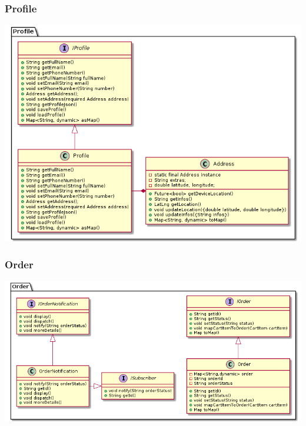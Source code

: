 \documentclass{article}
\begin{document}
\subsubsection{Profile}
\includegraphics[scale=0.5]{./out/MobileApp/Domain/Profile/Profile.png}

\subsubsection{Order}
\includegraphics[scale=0.5]{./out/MobileApp/Domain/Order/Order.png}
\end{document}

